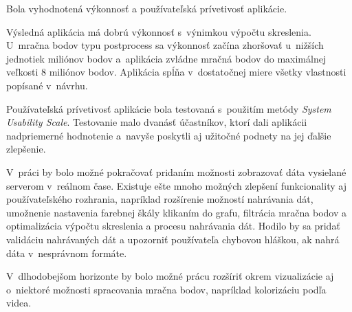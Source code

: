 Bola vyhodnotená výkonnosť a používateľská prívetivosť aplikácie. 

Výsledná aplikácia má dobrú výkonnosť s~výnimkou výpočtu skreslenia. U~mračna bodov typu postprocess sa výkonnosť začína zhoršovať u~nižších jednotiek miliónov bodov a~aplikácia zvládne mračná bodov do maximálnej veľkosti 8 miliónov bodov. Aplikácia spĺňa v~dostatočnej miere všetky vlastnosti popísané v~návrhu.

Používateľská prívetivosť aplikácie bola testovaná s~použitím metódy \emph{System Usability Scale}. Testovanie malo dvanásť účastníkov, ktorí dali aplikácii nadpriemerné hodnotenie a~navyše poskytli aj užitočné podnety na jej ďalšie zlepšenie.

V~práci by bolo možné pokračovať pridaním možnosti zobrazovať dáta vysielané serverom v~reálnom čase. Existuje ešte mnoho možných zlepšení funkcionality aj používateľského rozhrania, napríklad rozšírenie možností nahrávania dát, umožnenie nastavenia farebnej škály klikaním do grafu, filtrácia mračna bodov a optimalizácia výpočtu skreslenia a procesu nahrávania dát. Hodilo by sa pridať validáciu nahrávaných dát a upozorniť používateľa chybovou hláškou, ak nahrá dáta v~nesprávnom formáte.

V~dlhodobejšom horizonte by bolo možné prácu rozšíriť okrem vizualizácie aj o~niektoré možnosti spracovania mračna bodov, napríklad kolorizáciu podľa videa.


%
